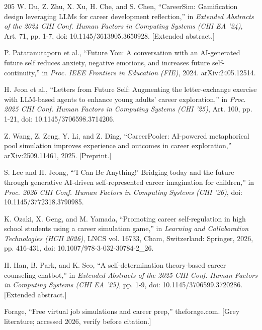\begin{thebibliography}{205}
 W. Du, Z. Zhu, X. Xu, H. Che, and S. Chen, ``CareerSim: Gamification design leveraging LLMs for career development reflection,'' in \textit{Extended Abstracts of the 2024 CHI Conf. Human Factors in Computing Systems (CHI EA '24)}, Art. 71, pp. 1-7, doi: 10.\allowbreak{}1145/\allowbreak{}3613905.\allowbreak{}3650928. [Extended abstract.]

 P. Pataranutaporn et al., ``Future You: A conversation with an AI-\allowbreak{}generated future self reduces anxiety, negative emotions, and increases future self-\allowbreak{}continuity,'' in \textit{Proc. IEEE Frontiers in Education (FIE)}, 2024. arXiv:2405.\allowbreak{}12514.

 H. Jeon et al., ``Letters from Future Self: Augmenting the letter-\allowbreak{}exchange exercise with LLM-based agents to enhance young adults' career exploration,'' in \textit{Proc. 2025 CHI Conf. Human Factors in Computing Systems (CHI '25)}, Art. 100, pp. 1-21, doi: 10.\allowbreak{}1145/\allowbreak{}3706598.\allowbreak{}3714206.

 Z. Wang, Z. Zeng, Y. Li, and Z. Ding, ``CareerPooler: AI-powered metaphorical pool simulation improves experience and outcomes in career exploration,'' arXiv:2509.\allowbreak{}11461, 2025. [Preprint.]

 S. Lee and H. Jeong, ``'I Can Be Anything!' Bridging today and the future through generative AI-driven self-\allowbreak{}represented career imagination for children,'' in \textit{Proc. 2026 CHI Conf. Human Factors in Computing Systems (CHI '26)}, doi: 10.\allowbreak{}1145/\allowbreak{}3772318.\allowbreak{}3790985.

 K. Ozaki, X. Geng, and M. Yamada, ``Promoting career self-\allowbreak{}regulation in high school students using a career simulation game,'' in \textit{Learning and Collaboration Technologies (HCII 2026)}, LNCS vol. 16733, Cham, Switzerland: Springer, 2026, pp. 416-431, doi: 10.\allowbreak{}1007/\allowbreak{}978-\allowbreak{}3-\allowbreak{}032-\allowbreak{}30784-\allowbreak{}2\_\allowbreak{}26.

 H. Han, B. Park, and K. Seo, ``A self-\allowbreak{}determination theory-\allowbreak{}based career counseling chatbot,'' in \textit{Extended Abstracts of the 2025 CHI Conf. Human Factors in Computing Systems (CHI EA '25)}, pp. 1-9, doi: 10.\allowbreak{}1145/\allowbreak{}3706599.\allowbreak{}3720286. [Extended abstract.]

 Forage, ``Free virtual job simulations and career prep,'' theforage.\allowbreak{}com. [Grey literature; accessed 2026, verify before citation.]


\end{thebibliography}
